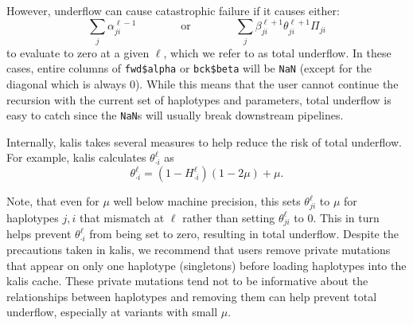 \documentclass[a4paper]{article}
\newcommand{\pkg}[1]{{\fontseries{m}\fontseries{b}\selectfont #1}}
\begin{document}
However, underflow can cause catastrophic failure if it causes either:
\[ \underset{j}{\sum} \alpha_{ji}^{\ell-1} \qquad\qquad \mbox{or} \qquad\qquad \underset{j}{\sum} \beta_{ji}^{\ell+1}\theta_{ji}^{\ell+1} \Pi_{ji}\]
to evaluate to zero at a given \(\ell\), which we refer to as total underflow.
In these cases, entire columns of \texttt{fwd\$alpha} or \texttt{bck\$beta} will be \texttt{NaN} (except for the diagonal which is always 0).
While this means that the user cannot continue the recursion with the current set of haplotypes and parameters, total underflow is easy to catch since the \texttt{NaN}s will usually break downstream pipelines.

Internally, \pkg{kalis} takes several measures to help reduce the risk of total underflow.
For example, \pkg{kalis} calculates \(\theta_{\cdot i}^{\ell}\) as
\[
	\theta_{\cdot i}^{\ell} = \left(1 - H_{\cdot i}^{\ell}\right) \left(1-2\mu\right) + \mu .
\]

Note, that even for \(\mu\) well below machine precision, this sets \(\theta_{j i}^{\ell}\) to \(\mu\) for haplotypes \(j,i\) that mismatch at \(\ell\) rather than setting \(\theta_{j i}^{\ell}\) to 0.
This in turn helps prevent \(\theta_{\cdot i}^{\ell}\) from being set to zero, resulting in total underflow.
Despite the precautions taken in \pkg{kalis}, we recommend that users remove private mutations that appear on only one haplotype (singletons) before loading haplotypes into the \pkg{kalis} cache.
These private mutations tend not to be informative about the relationships between haplotypes and removing them can help prevent total underflow, especially at variants with small \(\mu\).
\end{document}
